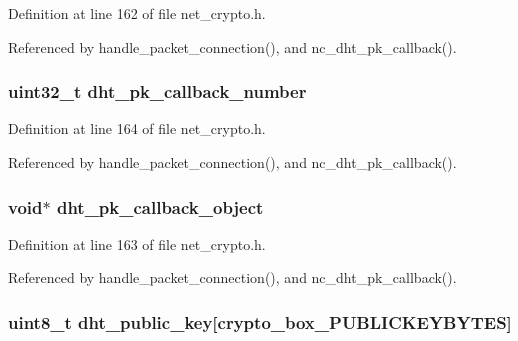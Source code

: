 Definition at line 162 of file net\+\_\+crypto.\+h.



Referenced by handle\+\_\+packet\+\_\+connection(), and nc\+\_\+dht\+\_\+pk\+\_\+callback().

\hypertarget{struct_crypto___connection_ab0413da421baacf312141b8ae3ec7762}{
\subsubsection[{dht\+\_\+pk\+\_\+callback\+\_\+number}]{\setlength{\rightskip}{0pt plus 5cm}uint32\+\_\+t dht\+\_\+pk\+\_\+callback\+\_\+number}}\label{struct_crypto___connection_ab0413da421baacf312141b8ae3ec7762}


Definition at line 164 of file net\+\_\+crypto.\+h.



Referenced by handle\+\_\+packet\+\_\+connection(), and nc\+\_\+dht\+\_\+pk\+\_\+callback().

\hypertarget{struct_crypto___connection_ab5d618d73b8d83fb07209433e7b448ee}{
\subsubsection[{dht\+\_\+pk\+\_\+callback\+\_\+object}]{\setlength{\rightskip}{0pt plus 5cm}void$\ast$ dht\+\_\+pk\+\_\+callback\+\_\+object}}\label{struct_crypto___connection_ab5d618d73b8d83fb07209433e7b448ee}


Definition at line 163 of file net\+\_\+crypto.\+h.



Referenced by handle\+\_\+packet\+\_\+connection(), and nc\+\_\+dht\+\_\+pk\+\_\+callback().

\hypertarget{struct_crypto___connection_ab2ecaa07625ad0ed5e07d3a1f0dcc939}{
\subsubsection[{dht\+\_\+public\+\_\+key}]{\setlength{\rightskip}{0pt plus 5cm}uint8\+\_\+t dht\+\_\+public\+\_\+key\mbox{[}crypto\+\_\+box\+\_\+\+P\+U\+B\+L\+I\+C\+K\+E\+Y\+B\+Y\+T\+E\+S\mbox{]}}}\label{struct_crypto___connection_ab2ecaa07625ad0ed5e07d3a1f0dcc939}


